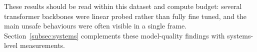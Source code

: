 \documentclass[conference]{IEEEtran}
\begin{document}
These results should be read within this dataset and compute budget: several
transformer backbones were linear probed rather than fully fine tuned, and the
main unsafe behaviours were often visible in a single frame.
Section~\ref{subsec:systems} complements these model-quality findings with
systems-level measurements.






\end{document}
